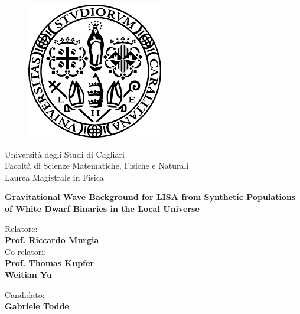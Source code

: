 \begin{titlepage}
\begin{figure}[!htb]
    \centering
    \includegraphics[keepaspectratio=true,scale=0.5]{images/Frontespizio/download.png}
\end{figure}

\begin{center}
    \LARGE{Università degli Studi di Cagliari}
    \vspace{5mm}
    \\ \large{Facoltà di Scienze Matematiche, Fisiche e Naturali}
    \vspace{5mm}
    \\ \LARGE{Laurea Magistrale in Fisica}
\end{center}

\vspace{15mm}
\begin{center}
    {\LARGE{\bf Gravitational Wave Background for LISA from Synthetic Populations of White Dwarf Binaries in the Local Universe}}
    
    
\end{center}
\vspace{30mm}

\begin{minipage}[t]{0.47\textwidth}
	{\large{Relatore:}{\normalsize\vspace{3mm}
	\\ 
        \large{\textbf{Prof. Riccardo Murgia}}\vspace{3mm} \\
        {\large{Co-relatori:}{\normalsize\vspace{3mm}
 	\bf\\ 
        \large{Prof. Thomas Kupfer\vspace{1mm}\\
                     Weitian Yu}
    \normalsize\vspace{3mm}\bf}}}}\\ 
\end{minipage}
\hfill
\begin{minipage}[t]{0.47\textwidth}\raggedleft
	{\large{Candidato:}{\normalsize\vspace{3mm} \bf\\ \large{Gabriele Todde}}}
\end{minipage}

\vspace{30mm}
\hrulefill
\\

\end{titlepage}

